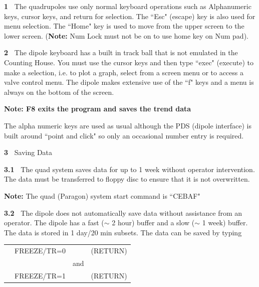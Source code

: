 {\begin{obsolete}
\begin{description}
\item{\bf 1~}\hskip0.1in The quadrupoles use only normal keyboard operations
such as
Alphanumeric keys, cursor keys, and return for selection.  The ``Esc"
(escape) key is also used for menu selection.  The ``Home" key is used to
move from the upper screen to the lower screen.  ({\bf Note:} Num Lock
must not be on to use home key on Num pad).
\item{\bf 2~}\hskip0.1in The dipole keyboard has a built in track ball that
is not
emulated in the Counting House.  You must use the cursor keys and then
type ``exec" (execute) to make a selection, i.e. to plot a graph, select
from a screen menu or to access a valve control menu.  The dipole makes
extensive use of the ``f" keys and a menu is always on the bottom of the
screen.
\item{}\hskip0.3in {\bf Note:  F8 exits the program and saves the trend data}
\item{}\hskip0.3in The alpha numeric keys are used as usual although the PDS
(dipole interface) is built around ``point and click" so only an occasional
number entry is required.
\item{\bf 3~}\hskip0.1in Saving Data
\item{\bf 3.1~}\hskip0.1in The quad system saves data for up to 1 week
without operator
intervention. The data must be transferred to floppy disc to ensure
that it is not overwritten.
\item{}\hskip0.3in {\bf Note:} The quad (Paragon) system start command is
``CEBAF"
\medskip
\item{\bf 3.2~}\hskip0.1in The dipole does not automatically save data without
assistance from an operator.  The dipole has a fast ($\sim$ 2 hour)
buffer and a slow ($\sim$ 1 week) buffer.  The data is stored in 1
day/20 min subsets.  The data can be saved by typing
\end{description}

\begin{center}
  \begin{tabular}{cccc}
	&FREEZE/TR=0 	&	& (RETURN)	\\
	&		& and	&		\\
	&FREEZE/TR=1	&	& (RETURN)	\\
  \end{tabular}
\end{center}


\end{obsolete}}
